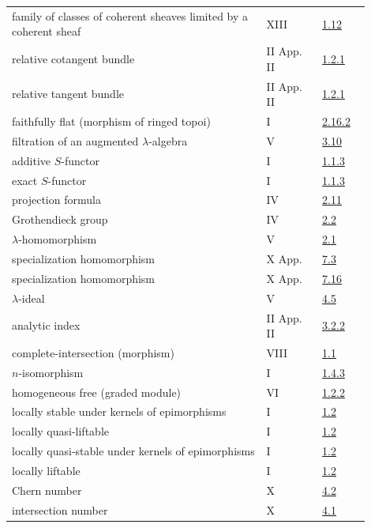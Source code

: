 \begin{longtable}{@{}>{\raggedright\arraybackslash}p{0.64\linewidth}>{\raggedright\arraybackslash}p{0.14\linewidth}>{\raggedright\arraybackslash}p{0.12\linewidth}@{}}
family of classes of coherent sheaves limited by a coherent sheaf & XIII & \hyperlink{sga6.e13.para.1-12}{1.12}\\
relative cotangent bundle & II App. II & \hyperlink{sga6.e02.para.1-2-1}{1.2.1}\\
relative tangent bundle & II App. II & \hyperlink{sga6.e02.para.1-2-1}{1.2.1}\\
faithfully flat (morphism of ringed topoi) & I & \hyperlink{sga6.e01.exercise.2-16-2}{2.16.2}\\
filtration of an augmented \(\lambda\)-algebra & V & \hyperlink{sga6.e05.para.3-10}{3.10}\\
additive \(S\)-functor & I & \hyperlink{sga6.e01.para.1-1-3}{1.1.3}\\
exact \(S\)-functor & I & \hyperlink{sga6.e01.para.1-1-3}{1.1.3}\\
projection formula & IV & \hyperlink{sga6.e04.para.2-11}{2.11}\\
Grothendieck group & IV & \hyperlink{sga6.e04.def.2-2}{2.2}\\
\(\lambda\)-homomorphism & V & \hyperlink{sga6.e05.def.2-1}{2.1}\\
specialization homomorphism & X App. & \hyperlink{sga6.e10.prop.7-3}{7.3}\\
specialization homomorphism & X App. & \hyperlink{sga6.e10.sec.7.16}{7.16}\\
\(\lambda\)-ideal & V & \hyperlink{sga6.e05.def.4-5}{4.5}\\
analytic index & II App. II & \hyperlink{sga6.e02.para.3-2-2}{3.2.2}\\
complete-intersection (morphism) & VIII & \hyperlink{sga6.e08.def.1-1}{1.1}\\
\(n\)-isomorphism & I & \hyperlink{sga6.e01.def.1-4-3}{1.4.3}\\
homogeneous free (graded module) & VI & \hyperlink{sga6.e06.eq.1-2-2}{1.2.2}\\
locally stable under kernels of epimorphisms & I & \hyperlink{sga6.e01.sec.1.2}{1.2}\\
locally quasi-liftable & I & \hyperlink{sga6.e01.sec.1.2}{1.2}\\
locally quasi-stable under kernels of epimorphisms & I & \hyperlink{sga6.e01.sec.1.2}{1.2}\\
locally liftable & I & \hyperlink{sga6.e01.sec.1.2}{1.2}\\
Chern number & X & \hyperlink{sga6.e10.ex.4-2}{4.2}\\
intersection number & X & \hyperlink{sga6.e10.sec.4.1}{4.1}\\

\end{longtable}
